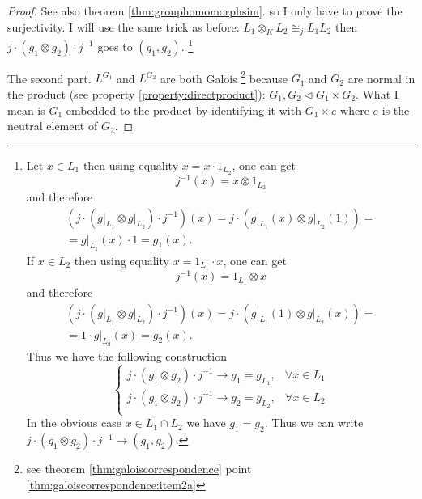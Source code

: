 \begin{proposition}
\begin{enumerate}
\begin{proof}
{        See also theorem \ref{thm:grouphomomorphsim}.
      }
      so I only have to prove the
      surjectivity.  I will use the same trick as before:
      $L_1 \otimes_K L_2 \cong_j L_1 L_2$ then
      $j \cdot \left(g_1 \otimes g_2\right) \cdot j^{-1}$ goes to
      $\left(g_1, g_2\right)$.
      \footnote{
        Let $x \in L_1$ then
        using equality $x = x \cdot 1_{L_2}$, one can get
        \[
        j^{-1}(x) = x \otimes 1_{L_2}
        \]
        and therefore
        \begin{eqnarray}
          \left(j \cdot
          \left(\left.g\right|_{L_1} \otimes \left.g\right|_{L_2}\right) \cdot
          j^{-1}\right)(x) = j \cdot \left(\left.g\right|_{L_1}(x) \otimes
          \left.g\right|_{L_2}(1)\right) =
          \nonumber \\
          = \left.g\right|_{L_1}(x) \cdot 1 = g_1(x).
          \nonumber
        \end{eqnarray}
        If $x \in L_2$ then
        using equality $x = 1_{L_1} \cdot x$, one can get
        \[
        j^{-1}(x) = 1_{L_1} \otimes x
        \]
        and therefore
        \begin{eqnarray}
          \left(j \cdot
          \left(\left.g\right|_{L_1} \otimes \left.g\right|_{L_2}\right) \cdot
          j^{-1}\right)(x) = j \cdot \left(\left.g\right|_{L_1}(1) \otimes
          \left.g\right|_{L_2}(x)\right) =
          \nonumber \\
          = 1 \cdot \left.g\right|_{L_2}(x) = g_2(x).
          \nonumber
        \end{eqnarray}
        Thus we have the following construction
        \[
        \begin{cases}
        j \cdot \left(g_1 \otimes g_2\right) \cdot j^{-1} \to g_1 = g_{L_1},& \forall x \in
        L_1\\
        j \cdot \left(g_1 \otimes g_2\right) \cdot j^{-1} \to g_2 = g_{L_2},& \forall x \in
        L_2\\
      \end{cases}
        \]
        In the obvious case $x \in L_1 \cap L_2$ we have $g_1 = g_2$.
        Thus we can write $j \cdot \left(g_1 \otimes g_2\right) \cdot
        j^{-1} \to \left(g_1, g_2\right)$.
      }

      The second part. $L^{G_1}$ and $L^{G_2}$ are both Galois
      \footnote{
        see theorem \ref{thm:galoiscorrespondence} point
        \ref{thm:galoiscorrespondence:item2a} 
      }
      because
      $G_1$ and $G_2$ are normal in the product
      (see property \ref{property:directproduct}):
      $G_1, G_2 \triangleleft G_1 \times G_2$. What I mean is $G_1$
      embedded to the product by identifying it with $G_1 \times e$
      where $e$ is the neutral element of $G_2$.


\end{proof}
\end{enumerate}
\end{proposition}
